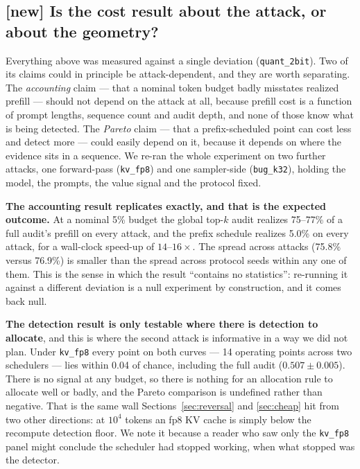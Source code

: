 \documentclass[11pt]{article}
\begin{document}
\subsection{[new] Is the cost result about the attack, or about the geometry?}
\label{sec:prefix2}

Everything above was measured against a single deviation (\texttt{quant\_2bit}).
Two of its claims could in principle be attack-dependent, and they are worth
separating. The \emph{accounting} claim --- that a nominal token budget badly
misstates realized prefill --- should not depend on the attack at all, because
prefill cost is a function of prompt lengths, sequence count and audit depth, and
none of those know what is being detected. The \emph{Pareto} claim --- that a
prefix-scheduled point can cost less and detect more --- could easily depend on it,
because it depends on where the evidence sits in a sequence. We re-ran the whole
experiment on two further attacks, one forward-pass (\texttt{kv\_fp8}) and one
sampler-side (\texttt{bug\_k32}), holding the model, the prompts, the value signal
and the protocol fixed.

\begin{table}[h]
\centering\small

\caption{[new] The accounting gap is a property of the schedule, not of the
deviation. Qwen3-1.7B, 64 sequences $\times$ 128 tokens, 5 protocol seeds; ``cost''
is realized prefill as a fraction of a full audit's. All three attacks are scored
on identical prompts with an identical scheduler.}
\label{tab:prefix2}
\end{table}

\textbf{The accounting result replicates exactly, and that is the expected
outcome.} At a nominal 5\% budget the global top-$k$ audit realizes 75--77\% of a
full audit's prefill on every attack, and the prefix schedule realizes 5.0\% on
every attack, for a wall-clock speed-up of $14$--$16\times$. The spread across
attacks (75.8\% versus 76.9\%) is smaller than the spread across protocol seeds
within any one of them. This is the sense in which the result ``contains no
statistics'': re-running it against a different deviation is a null experiment by
construction, and it comes back null.

\textbf{The detection result is only testable where there is detection to
allocate}, and this is where the second attack is informative in a way we did not
plan. Under \texttt{kv\_fp8} every point on both curves --- 14 operating points
across two schedulers --- lies within 0.04 of chance, including the full audit
($0.507 \pm 0.005$). There is no signal at any budget, so there is nothing for an
allocation rule to allocate well or badly, and the Pareto comparison is
undefined rather than negative. That is the same wall Sections~\ref{sec:reversal}
and \ref{sec:cheap} hit from two other directions: at $10^4$ tokens an fp8 KV cache
is simply below the recompute detection floor. We note it because a reader who saw
only the \texttt{kv\_fp8} panel might conclude the scheduler had stopped working,
when what stopped was the detector.
\end{document}
